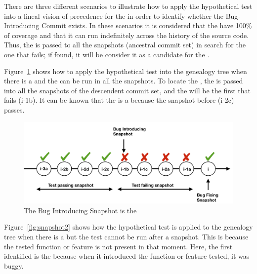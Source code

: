 \documentclass[a4paper, 12pt]{book}
\begin{document}
There are three different scenarios to illustrate how to apply the hypothetical test into a lineal vision of precedence for the  in order to identify whether the Bug-Introducing Commit exists. In these scenarios it is considered that the \TSB have 100\% of coverage and that it can run indefinitely across the history of the source code. Thus, the \TSB is passed to all the snapshots (ancestral commit set) in search for the one that fails; if found, it will be consider it as a candidate for the \BIC. %

Figure~\ref{fig:snapshot1} shows how to apply the hypothetical test into the genealogy tree when there is a \BIC and the \TSB can be run in all the snapshots. To locate the \BIC, the \TSB is passed into all the snapshots of the descendent commit set, and the \BIS will be the first that fails (i-1b). It can be known that the \BIS is a \BIC because the snapshot before (i-2c) passes. 

\begin{figure}[ht]
\centering
\includegraphics[width=\columnwidth]{img/snapshot1.png}
\caption{The Bug Introducing Snapshot is the \BIC}
\label{fig:snapshot1}       %
\end{figure}

Figure~\ref{fig:snapshot2} shows how  the hypothetical test is applied to the genealogy tree when there is a \BIC but the \TSB test cannot be run after a snapshot. This is because the tested function or feature is not present in that moment. Here, the first \BIS identified is the \BIC because when it introduced the function or feature tested, it was buggy.
\end{document}
